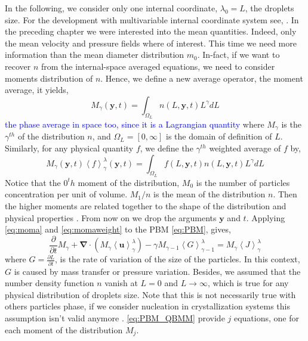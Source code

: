 In the following, we consider only one internal coordinate, $\lambda_0 = L$, the droplets size.
For the development with multivariable internal coordinate system see, \citet{marchisio2013computational}.
In the preceding chapter we were interested into the mean quantities.
Indeed, only the mean velocity and pressure fields where of interest. 
This time we need more information than the mean diameter distribution $m_0$. 
In-fact, if we want to recover $n$ from the internal-space averaged equations, we need to consider moments distribution of $n$. 
Hence, we define a new average operator, the moment average, it yields, 
\begin{equation}
    \label{eq:moma}
    M_{\gamma}(\bm{y},t) = \int_{\Omega_L} n(L,\bm{y},t) L^\gamma dL
\end{equation}
\textcolor{blue}{the phase average in space too, since it is a Lagrangian quantity}
where $M_{\gamma}$ is the $\gamma^{th}$ of the distribution $n$, and $\Omega_L=[0,\infty]$ is the domain of definition of $L$. 
Similarly, for any physical quantity $f$, we define the $\gamma^{th}$ weighted average of $f$ by,
\begin{equation}
    \label{eq:momaweight}
    M_{\gamma}(\bm{y},t)\left<f\right>^\lambda_\gamma(\bm{y},t)  = \int_{\Omega_L} f(L,\bm{y},t) n(L,\bm{y},t) L^\gamma dL
\end{equation}
Notice that the $0^th$ moment of the distribution, $M_0$ is the number of particles concentration per unit of volume.
$M_1/n$ is the mean of the distribution $n$. 
Then the higher moments are related together to the shape of the distribution and physical properties \citep{KAMP20011363}. 
From now on we drop the arguments $\bm{y}$ and $t$. 
Applying \ref{eq:moma} and \ref{eq:momaweight} to the PBM \ref{eq:PBM}, gives,
\begin{equation}
    \label{eq:PBM_QBMM}
    \frac{\partial}{\partial t} M_{\gamma}  + \bm{\nabla} \cdot \left(M_{\gamma}\bm{\left<u\right>}^\lambda_\gamma\right)  -\gamma M_{\gamma-1}\left<G\right>^\lambda_{\gamma-1}  = M_{\gamma}\left<{J}\right>^\lambda_\gamma 
\end{equation}
where $G = \frac{\partial L}{\partial t}$, is the rate of variation of the size of the particles.
In this context, $G$ is caused by mass transfer or pressure variation. 
Besides, we assumed that the number density function $n$ vanish at $L=0$ and $L\rightarrow\infty$, which is true for any physical distribution of droplets size.
Note that this is not necessarily true with others particles phase, if we consider nucleation in crystallization systems this assumption isn't valid anymore \citep{randolph2012theory}. 
\ref{eq:PBM_QBMM} provide $j$ equations, one for each moment of the distribution $M_j$.

